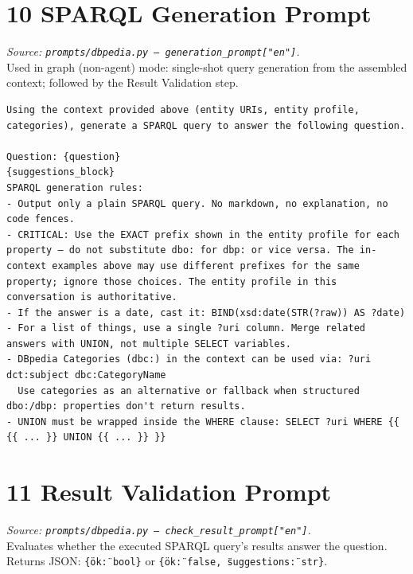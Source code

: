 \documentclass[11pt,a4paper]{article}
\begin{document}
\section{10 \quad SPARQL Generation Prompt}
\textit{Source: \texttt{prompts/dbpedia.py --- generation\_prompt["en"]}.}\\
Used in graph (non-agent) mode: single-shot query generation from the assembled context; followed by the Result Validation step.

\begin{lstlisting}[style=prompt]
Using the context provided above (entity URIs, entity profile, categories), generate a SPARQL query to answer the following question.

Question: {question}
{suggestions_block}
SPARQL generation rules:
- Output only a plain SPARQL query. No markdown, no explanation, no code fences.
- CRITICAL: Use the EXACT prefix shown in the entity profile for each property — do not substitute dbo: for dbp: or vice versa. The in-context examples above may use different prefixes for the same property; ignore those choices. The entity profile in this conversation is authoritative.
- If the answer is a date, cast it: BIND(xsd:date(STR(?raw)) AS ?date)
- For a list of things, use a single ?uri column. Merge related answers with UNION, not multiple SELECT variables.
- DBpedia Categories (dbc:) in the context can be used via: ?uri dct:subject dbc:CategoryName
  Use categories as an alternative or fallback when structured dbo:/dbp: properties don't return results.
- UNION must be wrapped inside the WHERE clause: SELECT ?uri WHERE {{ {{ ... }} UNION {{ ... }} }}
\end{lstlisting}

\section{11 \quad Result Validation Prompt}
\textit{Source: \texttt{prompts/dbpedia.py --- check\_result\_prompt["en"]}.}\\
Evaluates whether the executed SPARQL query's results answer the question. Returns JSON: \texttt{\{\"ok\": bool\}} or \texttt{\{\"ok\": false, \"suggestions\": str\}}.
\end{document}
